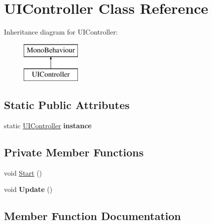 \hypertarget{class_u_i_controller}{}\section{U\+I\+Controller Class Reference}
\label{class_u_i_controller}
Inheritance diagram for U\+I\+Controller\+:\begin{figure}[H]
\begin{center}
\leavevmode
\includegraphics[height=2.000000cm]{class_u_i_controller}
\end{center}
\end{figure}
\subsection*{Static Public Attributes}
\begin{DoxyCompactItemize}
\item 
\mbox{\label{class_u_i_controller_a83f504b1441fb49aef176d1c013bfc8c}} 
static \hyperlink{class_u_i_controller}{U\+I\+Controller} {\bfseries instance}
\end{DoxyCompactItemize}
\subsection*{Private Member Functions}
\begin{DoxyCompactItemize}
\item 
void \hyperlink{class_u_i_controller_a676b3b972c33885db4565ee43f23e459}{Start} ()
\item 
\mbox{\label{class_u_i_controller_adc5b0854a26bbcd71cc33274960bd0a9}} 
void {\bfseries Update} ()
\end{DoxyCompactItemize}


\subsection{Member Function Documentation}
\mbox{\label{class_u_i_controller_a676b3b972c33885db4565ee43f23e459}} 
